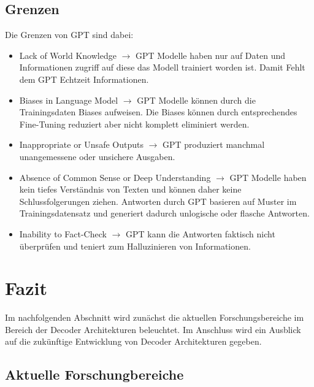 \documentclass[conference]{IEEEtran}
\begin{document}
\subsection{Grenzen}
Die Grenzen von GPT sind dabei:
\begin{itemize}
    \item Lack of World Knowledge $\rightarrow$ GPT Modelle haben nur auf Daten und Informationen zugriff auf diese das Modell trainiert worden ist. Damit Fehlt dem GPT Echtzeit Informationen.
    \item Biases in Language Model $\rightarrow$ GPT Modelle können durch die Trainingsdaten Biases aufweisen. Die Biases können durch entsprechendes Fine-Tuning reduziert aber nicht komplett eliminiert werden.
    \item Inappropriate or Unsafe Outputs $\rightarrow$ GPT produziert manchmal unangemessene oder unsichere Ausgaben.
    \item Absence of Common Sense or Deep Understanding $\rightarrow$ GPT Modelle haben kein tiefes Verständnis von Texten und können daher keine Schlussfolgerungen ziehen. Antworten durch GPT basieren auf Muster im Trainingsdatensatz und generiert dadurch unlogische oder flasche Antworten.
    \item Inability to Fact-Check $\rightarrow$ GPT kann die Antworten faktisch nicht überprüfen und teniert zum Halluzinieren von Informationen.
\end{itemize}

\section{Fazit}
Im nachfolgenden Abschnitt wird zunächst die aktuellen Forschungsbereiche im Bereich der Decoder Architekturen beleuchtet. Im Anschluss wird ein Ausblick auf die zukünftige Entwicklung von Decoder Architekturen gegeben.
\subsection{Aktuelle Forschungbereiche}
\end{document}
